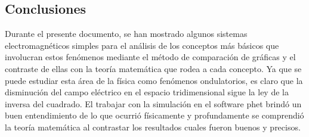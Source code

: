 \documentclass[a4paper,10pt]{article}
\begin{document}
\begin{multicols}{2}
\section{\textcolor{MiColor1}{\textbf{Conclusiones}}}
Durante el presente documento, se han mostrado algunos sistemas electromagnéticos simples para el análisis de los conceptos más básicos que involucran estos fenómenos mediante el método de comparación de gráficas y el contraste de ellas con la teoría matemática que rodea a cada concepto. Ya que se puede estudiar esta área de la física como fenómenos ondulatorios, es claro que la disminución del campo eléctrico en el espacio tridimensional sigue la ley de la inversa del cuadrado. El trabajar con la simulación en el software phet brindó un buen entendimiento de lo que ocurrió físicamente y profundamente se comprendió la teoría matemática al contrastar los resultados cuales fueron  buenos y precisos. 

\end{multicols}
\end{document}
